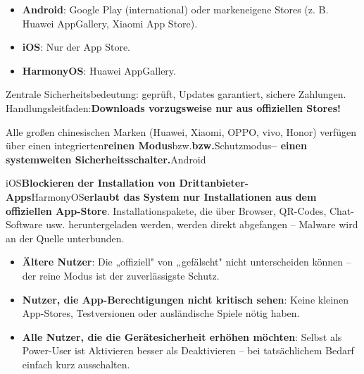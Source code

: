 


\begin{itemize}
  \item \textbf{Android}: Google Play (international) oder markeneigene Stores (z. B. Huawei AppGallery, Xiaomi App Store).
  \item \textbf{iOS}: Nur der App Store.
  \item \textbf{HarmonyOS}: Huawei AppGallery.
\end{itemize}

Zentrale Sicherheitsbedeutung: geprüft, Updates garantiert, sichere Zahlungen. Handlungsleitfaden:\textbf{Downloads vorzugsweise nur aus offiziellen Stores!}


Alle großen chinesischen Marken (Huawei, Xiaomi, OPPO, vivo, Honor) verfügen über einen integrierten\textbf{reinen Modus}bzw.\textbf{bzw.}Schutzmodus\textbf{– einen systemweiten Sicherheitsschalter.}Android


iOS\textbf{Blockieren der Installation von Drittanbieter-Apps}HarmonyOS\textbf{erlaubt das System nur Installationen aus dem offiziellen App-Store}. Installationspakete, die über Browser, QR-Codes, Chat-Software usw. heruntergeladen werden, werden direkt abgefangen – Malware wird an der Quelle unterbunden.


\begin{itemize}
  \item \textbf{Ältere Nutzer}: Die „offiziell" von „gefälscht" nicht unterscheiden können – der reine Modus ist der zuverlässigste Schutz.
  \item \textbf{Nutzer, die App-Berechtigungen nicht kritisch sehen}: Keine kleinen App-Stores, Testversionen oder ausländische Spiele nötig haben.
  \item \textbf{Alle Nutzer, die die Gerätesicherheit erhöhen möchten}: Selbst als Power-User ist Aktivieren besser als Deaktivieren – bei tatsächlichem Bedarf einfach kurz ausschalten.
\end{itemize}

